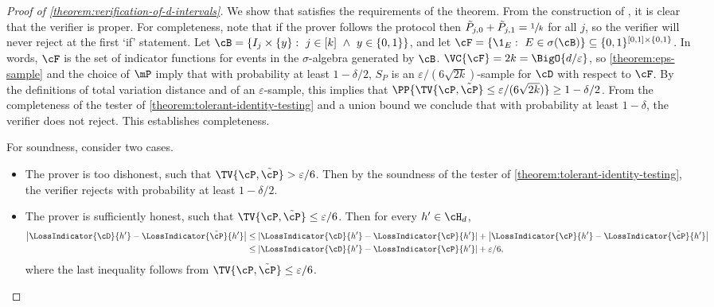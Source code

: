 \documentclass{toc}
\begin{document}
\begin{proof}[Proof of \cref{theorem:verification-of-d-intervals}]
We show that  %
	satisfies the requirements of the theorem. From the construction of , it is clear that the verifier is proper. For completeness, note that if the prover follows the protocol then $\tilde{P}_{j,0} + \tilde{P}_{j,1} = \sfrac{1}{k}$ for all $j$, so the verifier will never reject at the first `if' statement. Let $\cB = \{I_j \times \{y\}: ~ j \in [k] ~ \land ~ y \in \{0,1\}\}$, and let $\cF = \{\1_E: ~ E \in \sigma(\cB)\} \subseteq \{0,1\}^{[0,1]\times \{0,1\}}$. In words, $\cF$ is the set of indicator functions for events in the $\sigma$-algebra generated by $\cB$. $\VC{\cF} = 2k = \BigO{d/\varepsilon}$, so \cref{theorem:eps-sample} and the choice of $\mP$ imply that with probability at least $1-\delta/2$, $S_P$ is an $\varepsilon/(6\sqrt{2k})$-sample for $\cD$ with respect to $\cF$. By the definitions of total variation distance and of an $\varepsilon$-sample, this implies that $\PP{\TV{\cP,\tilde{\cP}} \leq \varepsilon/(6\sqrt{2k})} \geq 1-\delta/2$. From the completeness of the tester of \cref{theorem:tolerant-identity-testing} and a union bound we conclude that with probability at least $1-\delta$, the verifier does not reject. This establishes completeness.

	For soundness, consider two cases. 
	\begin{itemize}
		\item{
			The prover is too dishonest, such that $\TV{\cP,\tilde{\cP}} > \varepsilon/6$. Then by the soundness of the tester of \cref{theorem:tolerant-identity-testing}, the verifier rejects with probability at least $1-\delta/2$.
		} 
		\item{
			The prover is sufficiently honest, such that $\TV{\cP,\tilde{\cP}} \leq \varepsilon/6$. 
			Then for every $h' \in \cH_d$,
			\begin{align}
				\left|\LossIndicator{\cD}{h'} - \LossIndicator{\tilde{\cP}}{h'}\right| &\leq \left|\LossIndicator{\cD}{h'} - \LossIndicator{\cP}{h'}\right| + \left|\LossIndicator{\cP}{h'} - \LossIndicator{\tilde{\cP}}{h'}\right|  \nonumber\\
				&\leq \left|\LossIndicator{\cD}{h'} - \LossIndicator{\cP}{h'}\right| + \varepsilon/6, \label{eq:LD-vs-LPtilde}
			\end{align}
			where the last inequality follows from $\TV{\cP,\tilde{\cP}} \leq \varepsilon/6$.
		
}
\end{itemize}
\end{proof}
\end{document}
